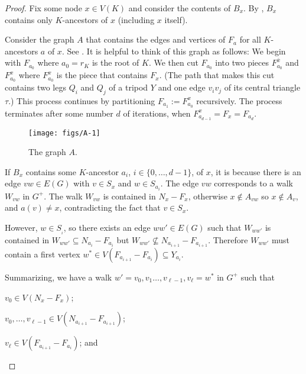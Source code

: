 \documentclass{patmorin}
\begin{document}
\begin{proof}
  Fix some node $x\in V(K)$ and consider the contents of $B_x$.  By , $B_x$ contains only $K$-ancestors of $x$ (including $x$ itself). 
  
  Consider the graph $A$ that contains the edges and vertices of $F_{a}$ for all $K$-ancestors $a$ of $x$. See .  It is helpful to think of this graph as follows:  We begin with $F_{a_0}$ where $a_0=r_K$ is the root of $K$.  We then cut $F_{a_0}$ into two pieces $F^{\bar{x}}_{a_0}$ and $F^x_{a_0}$ where $F^x_{a_0}$ is the piece that contains $F_x$. (The path that makes this cut contains two legs $Q_i$ and $Q_j$ of a tripod $Y$ and one edge $v_iv_j$ of its central triangle $\tau$.)  This process continues by partitioning $F_{a_1}:=F^x_{a_0}$ recursively.  The process terminates after some number $d$ of iterations, when $F^x_{a_{d-1}}=F_x=F_{a_d}$.

  \begin{figure}
    \begin{center}
        \texttt{[image: figs/A-1]}
    \end{center}
    \caption{The graph $A$.}
  \end{figure}

  If $B_x$ contains some $K$-ancestor $a_i$, $i\in\{0,\ldots,d-1\}$, of $x$, it is because there is an edge $vw\in E(G)$ with $v\in S_x$ and $w\in S_{a_i}$.  The edge $vw$ corresponds to a walk $W_{vw}$ in $G^+$. The walk $W_{vw}$ is contained in $N_x-F_x$, otherwise $x\not\in A_{vw}$ so $x\not\in A_v$, and $a(v)\neq x$, contradicting the fact that $v\in S_x$.
  
  However, $w\in S_{_i}$, so there exists an edge $ww'\in E(G)$ such that   $W_{ww'}$ is contained in $W_{ww'}\subseteq N_{a_i}-F_{a_i}$ but $W_{ww'}\not\subseteq N_{a_{i+1}}-F_{a_{i+1}}$.  Therefore $W_{ww'}$ must contain a first vertex $w^*\in V(F_{a_{i+1}}-F_{a_{i}})\subseteq Y_{a_i}$.

  Summarizing, we have a walk $w'=v_0,v_1\ldots,v_{\ell-1},v_\ell=w^*$ in $G^+$ such that
  \begin{compactenum}[(i)]
    \item $v_0\in V(N_x-F_x)$;
    
    \item $v_0,\ldots,v_{\ell-1}\in V(N_{a_{i+1}}-F_{a_{i+1}})$;
    
    \item $v_\ell\in V(F_{a_{i+1}}-F_{a_i})$; and
    

\end{compactenum}
\end{proof}
\end{document}
